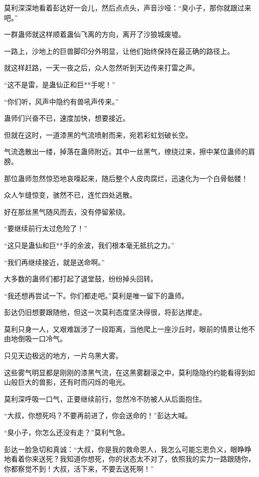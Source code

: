 \begin{this_body}
莫利深深地看着彭达好一会儿，然后点点头，声音沙哑：“臭小子，那你就跟过来吧。”

一群蛊师就这样顺着蛊仙飞离的方向，离开了沙狼城废墟。

一路上，沙地上的巨兽脚印分外明显，让他们始终保持在最正确的路径上。

就这样赶路，一天一夜之后，众人忽然听到天边传来打雷之声。

“这不是雷，是蛊仙正和巨**手呢！”

“你们听，风声中隐约有兽吼声传来。”

蛊师们兴奋不已，速度加快，想要接近。

但就在这时，一道漆黑的气流喷射而来，宛若彩虹划破长空。

气流逸散出一缕，掉落在蛊师附近。其中一丝黑气，缭绕过来，擦中某位蛊师的肩膀。

那位蛊师忽然惊恐地哀嚎起来，随后整个人皮肉腐烂，迅速化为一个白骨骷髅！

众人乍缝惊变，骇然不已，连忙四处逃散。

好在那丝黑气随风而去，没有停留萦绕。

“要继续前行太过危险了！”

“这只是蛊仙和巨**手的余波，我们根本毫无抵抗之力。”

“我们再继续接近，就是送命啊。”

大多数的蛊师们都打起了退堂鼓，纷纷掉头回转。

“我还想再尝试一下。你们都走吧。”莫利是唯一留下的蛊师。

彭达仍旧想要跟随他，但这一次莫利态度坚决得很，将彭达撵走。

莫利只身一人，又艰难跋涉了一段距离，当他爬上一座沙丘时，眼前的情景让他不由地倒吸一口冷气。

只见天边极远的地方，一片乌黑大雾。

这些雾气明显都是刚刚的漆黑气流，在这黑雾翻滚之中，莫利隐隐约约能看得到如山般巨大的兽影，还有时而闪烁的电光。

莫利深呼吸一口气，正要继续前行，忽然冷不防被人从后面抱住。

“大叔，你想死吗？不要再前进了，你会送命的！”彭达大喊。

“臭小子，你怎么还没有走？”莫利气急。

彭达一脸急切和真诚：“大叔，你是我的救命恩人，我怎么可能忘恩负义，眼睁睁地看着你来送死？我知道你想死，你的状态太不对了，依照我的实力一路跟随你，你都察觉不到！大叔，活下来，不要去送死啊！”


\end{this_body}
